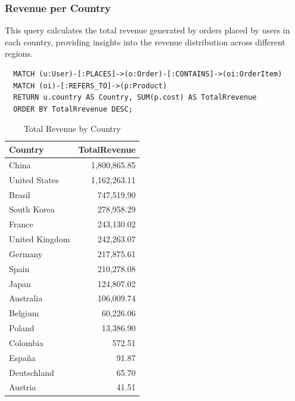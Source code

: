 \documentclass[a4paper,12pt]{article}
\begin{document}
\subsubsection{Revenue per Country}
This query calculates the total revenue generated by orders placed by users in each country, providing insights into the revenue distribution across different regions.
\begin{verbatim}
  MATCH (u:User)-[:PLACES]->(o:Order)-[:CONTAINS]->(oi:OrderItem)
  MATCH (oi)-[:REFERS_TO]->(p:Product)
  RETURN u.country AS Country, SUM(p.cost) AS TotalRrevenue
  ORDER BY TotalRrevenue DESC;
\end{verbatim}
\begin{table}[h!]
  \centering
  \caption{Total Revenue by Country}
  \label{tab:total_revenue}
  \begin{tabular}{l r}
      \toprule
      \textbf{Country} & \textbf{TotalRevenue} \\
      \midrule
      China           & 1,800,865.85 \\
      United States   & 1,162,263.11 \\
      Brasil          & 747,519.90 \\
      South Korea     & 278,958.29 \\
      France          & 243,130.02 \\
      United Kingdom  & 242,263.07 \\
      Germany         & 217,875.61 \\
      Spain           & 210,278.08 \\
      Japan           & 124,807.02 \\
      Australia       & 106,009.74 \\
      Belgium         & 60,226.06 \\
      Poland          & 13,386.90 \\
      Colombia        & 572.51 \\
      España          & 91.87 \\
      Deutschland     & 65.70 \\
      Austria         & 41.51 \\
      \bottomrule
  \end{tabular}
\end{table}
\end{document}
